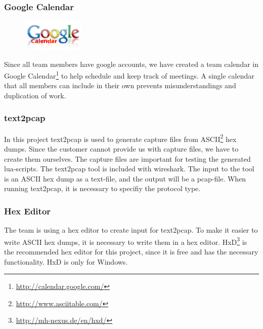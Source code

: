 \subsubsection{Google Calendar}
\begin{figure}
	\vspace{-20pt}
	\includegraphics[width=3cm]{./planning/img/google_calendar_logo}
	\vspace{-20pt}
\end{figure}
Since all team members have google accounts, we have created a team calendar
in Google Calendar\footnote{\url{http://calendar.google.com/}}
to help schedule and keep track of meetings. A single calendar that all
members can include in their own prevents misunderstandings and duplication
of work.

\subsubsection{text2pcap}
In this project text2pcap is used to generate capture files from ASCII\footnote{\url{http://www.asciitable.com/}}
\glspl{hex dump}. Since the customer cannot provide us with capture files, 
we have to create them ourselves. The capture files are important for testing
the generated \Gls{lua}-\glspl{script}. The text2pcap tool is included with \Gls{wireshark}. 
The input to the tool is an ASCII \gls{hex dump} as a text-file, and the output will
be a \gls{pcap-file}. When running text2pcap, it is necessary to specifiy the \gls{protocol}
type.

\subsubsection{Hex Editor}
The team is using a hex editor to create input for text2pcap. To make it
easier to write ASCII \glspl{hex dump}, it is necessary to write them in a hex editor.
HxD\footnote{\url{http://mh-nexus.de/en/hxd/}} is the recommended hex editor
for this project, since it is free and has the necessary functionality. HxD is
only for Windows.

